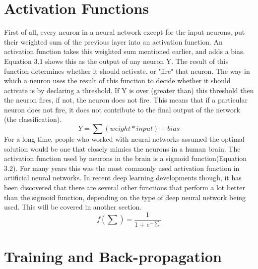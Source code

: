 \documentclass[12pt]{report} %
\begin{document}
\section{Activation Functions}	
	First of all, every neuron in a neural network except for the input neurons, put their weighted sum of the previous layer into an activation function. An activation function takes this weighted sum mentioned earlier, and adds a bias. Equation 3.1 shows this as the output of any neuron Y. The result of this function determines whether it should activate, or "fire" that neuron. The way in which a neuron uses the result of this function to decide whether it should activate is by declaring a threshold. If Y is over (greater than) this threshold then the neuron fires, if not, the neuron does not fire. This means that if a particular neuron does not fire, it does not contribute to the final output of the network (the classification)\cite{activationMedium}. 
\begin{equation}
Y = \sum  (weight * input) + bias
\end{equation}	
	For a long time, people who worked with neural networks assumed the optimal solution would be one that closely mimics the neurons in a human brain. The activation function used by neurons in the brain is a sigmoid function(Equation 3.2)\cite{KubatMachineLearn}. For many years this was the most commonly used activation function in artificial neural networks. In recent deep learning developments though, it has been discovered that there are several other functions that perform a lot better than the sigmoid function, depending on the type of deep neural network being used. This will be covered in another section.
\begin{equation}
f(\sum) = \frac{1}{1+e^{-\sum}}
\end{equation}		 

\section{Training and Back-propagation}	
\end{document}
